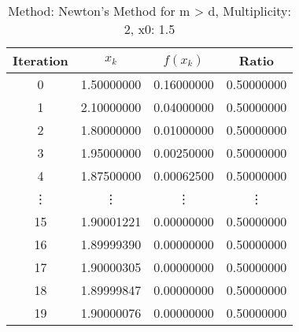 \begin{table}
\centering
\caption{Method: Newton's Method for m > d, Multiplicity: 2, x0: 1.5}
\label{tab:table_Newton's_Method_for_m_>_d_2_1_5}
\begin{tabular}{c c c c}
\toprule
Iteration &      $x_k$ &   $f(x_k)$ &      Ratio \\
\midrule
        0 & 1.50000000 & 0.16000000 & 0.50000000 \\
        1 & 2.10000000 & 0.04000000 & 0.50000000 \\
        2 & 1.80000000 & 0.01000000 & 0.50000000 \\
        3 & 1.95000000 & 0.00250000 & 0.50000000 \\
        4 & 1.87500000 & 0.00062500 & 0.50000000 \\
   \vdots &     \vdots &     \vdots &     \vdots \\
       15 & 1.90001221 & 0.00000000 & 0.50000000 \\
       16 & 1.89999390 & 0.00000000 & 0.50000000 \\
       17 & 1.90000305 & 0.00000000 & 0.50000000 \\
       18 & 1.89999847 & 0.00000000 & 0.50000000 \\
       19 & 1.90000076 & 0.00000000 & 0.50000000 \\
\bottomrule
\end{tabular}
\end{table}
